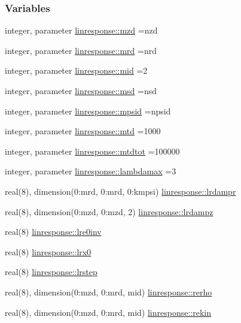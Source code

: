 \subsubsection*{Variables}
\begin{DoxyCompactItemize}
\item 
integer, parameter \hyperlink{namespacelinresponse_a61b4047baf19d042872d8ceed0416b1e}{linresponse\+::mzd} =nzd
\item 
integer, parameter \hyperlink{namespacelinresponse_a0f1c9b37ba70c482d06a765ac59da516}{linresponse\+::mrd} =nrd
\item 
integer, parameter \hyperlink{namespacelinresponse_a5ce6645ed59d7c6845a4eaa13cc060ed}{linresponse\+::mid} =2
\item 
integer, parameter \hyperlink{namespacelinresponse_a9d6252ae4cde6390991667cd981f7a5a}{linresponse\+::msd} =nsd
\item 
integer, parameter \hyperlink{namespacelinresponse_a7d139c0bde0ee62d24b2906275e8953a}{linresponse\+::mpsid} =npsid
\item 
integer, parameter \hyperlink{namespacelinresponse_abd8480f5e3944238c71b36aa4facd7b5}{linresponse\+::mtd} =1000
\item 
integer, parameter \hyperlink{namespacelinresponse_a6bf64170d4100fc94f7b85375e147082}{linresponse\+::mtdtot} =100000
\item 
integer, parameter \hyperlink{namespacelinresponse_a799a3287dd27fc3b00e5f050ed9c95df}{linresponse\+::lambdamax} =3
\item 
real(8), dimension(0\+:mrd, 0\+:mrd, 0\+:kmpsi) \hyperlink{namespacelinresponse_a77986a25dd6b5d30220a7f3294c79016}{linresponse\+::lrdampr}
\item 
real(8), dimension(0\+:mzd, 0\+:mzd, 2) \hyperlink{namespacelinresponse_a2b636d6bb28e43387430e6b07d33fa15}{linresponse\+::lrdampz}
\item 
real(8) \hyperlink{namespacelinresponse_ae037dc32bfb1ea3484f9930a392110ec}{linresponse\+::lre0inv}
\item 
real(8) \hyperlink{namespacelinresponse_a955e3100803d9f5ebd0fc30925fb35ff}{linresponse\+::lrx0}
\item 
real(8) \hyperlink{namespacelinresponse_aa17805959857e7f4d64f4b75f392dd79}{linresponse\+::lrstep}
\item 
real(8), dimension(0\+:mzd, 0\+:mrd, mid) \hyperlink{namespacelinresponse_ac1edf3417df4c7be9af93e89cce968a8}{linresponse\+::rerho}
\item 
real(8), dimension(0\+:mzd, 0\+:mrd, mid) \hyperlink{namespacelinresponse_af0947a40ccb29beef134d88918db4a89}{linresponse\+::rekin}

\end{DoxyCompactItemize}
